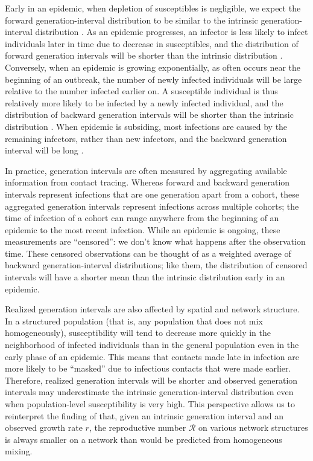 \documentclass[12pt]{article}
\newcommand{\RR}{\ensuremath{{\mathcal R}}}
\begin{document}
Early in an epidemic, when depletion of susceptibles is negligible, we expect the forward generation-interval distribution to be similar to the intrinsic generation-interval distribution \citep{champredon2015intrinsic}.
As an epidemic progresses, an infector is less likely to infect individuals later in time due to decrease in susceptibles, 
and the distribution of forward generation intervals will be shorter than the intrinsic distribution \citep{kenah2008generation, tomba2010some, champredon2015intrinsic}.
Conversely, when an epidemic is growing exponentially, as often occurs near the beginning of an outbreak, the number of newly infected individuals will be large relative to the number infected earlier on. 
A susceptible individual is thus relatively more likely to be infected by a newly infected individual, 
and the distribution of backward generation intervals will be shorter than the intrinsic distribution \citep{champredon2015intrinsic, britton2019estimation}.
When epidemic is subsiding, most infections are caused by the remaining infectors, rather than new infectors, and the backward generation interval will be long \citep{tomba2010some, champredon2015intrinsic}.

In practice, generation intervals are often measured by aggregating available information from contact tracing. 
Whereas forward and backward generation intervals represent infections that are one generation apart from a cohort, these aggregated generation intervals represent infections across multiple cohorts; 
the time of infection of a cohort can range anywhere from the beginning of an epidemic to the most recent infection.
While an epidemic is ongoing, these measurements are ``censored'': we don't know what happens after the observation time.
These censored observations can be thought of as a weighted average of backward generation-interval distributions; like them, the distribution of censored intervals will have a shorter mean than the intrinsic distribution early in an epidemic.

Realized generation intervals are also affected by spatial and network structure.
In a structured population (that is, any population that does not mix homogeneously), susceptibility will tend to decrease more quickly in the neighborhood of infected individuals than in the general population even in the early phase of an epidemic. 
This means that contacts made late in infection are more likely to be ``masked'' due to infectious contacts that were made earlier.
Therefore, realized generation intervals will be shorter and observed generation intervals may underestimate the intrinsic generation-interval distribution even when population-level susceptibility is very high.
This perspective allows us to reinterpret the finding of \cite{trapman2016inferring} that, given an intrinsic generation interval and an observed growth rate $r$, the reproductive number $\RR$ on various network structures is always smaller on a network than would be predicted from homogeneous mixing.
\end{document}
